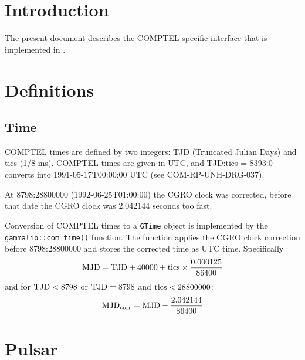 \documentclass{article}[12pt,a4]
\begin{document}
\frontpage


\section{Introduction}

The present document describes the COMPTEL specific interface that is implemented in \this.


\section{Definitions}

\subsection{Time}

COMPTEL times are defined by two integers: TJD (Truncated Julian Days) and tics (1/8 ms).
COMPTEL times are given in UTC, and TJD:tics = 8393:0 converts into 1991-05-17T00:00:00 UTC
(see COM-RP-UNH-DRG-037). 

At 8798:28800000 (1992-06-25T01:00:00) the CGRO clock was corrected, before that date the
CGRO clock was 2.042144 seconds too fast.

Conversion of COMPTEL times to a {\tt GTime} object is implemented by the {\tt gammalib::com\_time()}
function. The function applies the CGRO clock correction before 8798:28800000 and stores the
corrected time as UTC time. Specifically
\begin{equation}
{\rm MJD} = {\rm TJD} + 40000 + {\rm tics} \times \frac{0.000125}{86400}
\end{equation}
and for ${\rm TJD} < 8798$ or ${\rm TJD} = 8798$ and ${\rm tics} < 28800000$:
\begin{equation}
{\rm MJD}_{\rm corr} = {\rm MJD} - \frac{2.042144}{86400}
\end{equation}


\section{Pulsar}
\end{document}

